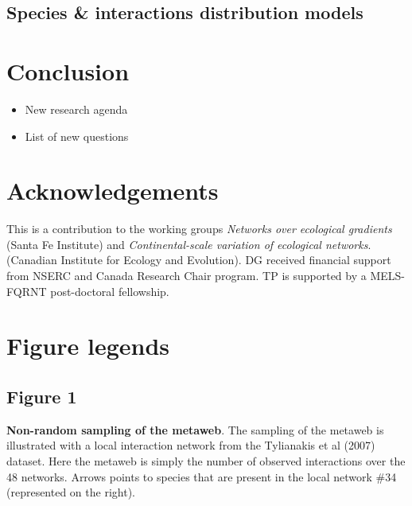 \documentclass[12pt]{article}
\begin{document}

\subsection*{Species \& interactions distribution models}

\newpage
\section*{Conclusion}

\begin{itemize}
\item New research agenda\\

\item List of new questions \\
\end{itemize}

\newpage
\section*{Acknowledgements}
This is a contribution to the working groups \emph{Networks over ecological
gradients} (Santa Fe Institute) and \emph{Continental-scale variation of
ecological networks}. (Canadian Institute for Ecology and Evolution). DG
received financial support from NSERC and Canada Research Chair program. TP
is supported by a MELS-FQRNT post-doctoral fellowship.
\newpage

\printbibliography

\newpage
\section*{Figure legends}

\subsection*{Figure 1}
\textbf{Non-random sampling of the metaweb}. The sampling of the metaweb is illustrated with a local interaction network from the Tylianakis et al (2007) dataset. Here the metaweb is simply the number of observed interactions over the 48 networks. Arrows points to species that are present in the local network \#34 (represented on the right). 
\end{document}
